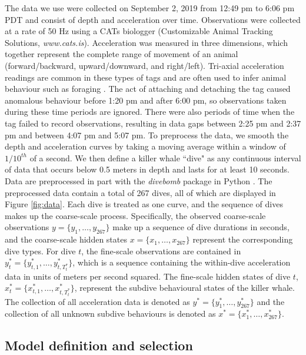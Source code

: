 The data we use were collected on September 2, 2019 from 12:49 pm to 6:06 pm PDT and consist of depth and acceleration over time. Observations were collected at a rate of 50 Hz using a CATs biologger (Customizable Animal Tracking Solutions, {\em{www.cats.is}}). Acceleration was measured in three dimensions, which together represent the complete range of movement of an animal (forward/backward, upward/downward, and right/left). Tri-axial acceleration readings are common in these types of tags and are often used to infer animal behaviour such as foraging \citep{Cade:2017,Fehlmann:2017,Wright:2017}. The act of attaching and detaching the tag caused anomalous behaviour before 1:20 pm and after 6:00 pm, so observations taken during these time periods are ignored. There were also periods of time when the tag failed to record observations, resulting in data gaps between 2:25 pm and 2:37 pm and between 4:07 pm and 5:07 pm. To preprocess the data, we smooth the depth and acceleration curves by taking a moving average within a window of $1/10^{th}$ of a second. We then define a killer whale ``dive" as any continuous interval of data that occurs below 0.5 meters in depth and lasts for at least 10 seconds. Data are preprocessed in part with the \textit{divebomb} package in Python \citep{Nunes:2018}. The preprocessed data contain a total of 267 dives, all of which are displayed in Figure \ref{fig:data}. Each dive is treated as one curve, and the sequence of dives makes up the coarse-scale process. Specifically, the observed coarse-scale observations $y = \big\{y_1,\ldots,y_{267}\big\}$ make up a sequence of dive durations in seconds, and the coarse-scale hidden states $x = \big\{x_1,\ldots,x_{267}\big\}$ represent the corresponding dive types. For dive $t$, the fine-scale observations are contained in $y^*_{t} = \big\{y^*_{t,1},\ldots,y^*_{t,T^*_t} \big\}$, which is a sequence containing the within-dive acceleration data in units of meters per second squared. The fine-scale hidden states of dive $t$, $x^*_{t} = \big\{x^*_{t,1},\ldots,x^*_{t,T^*_t} \big\}$, represent the subdive behavioural states of the killer whale. The collection of all acceleration data is denoted as $y^* = \big\{y^*_1,\ldots,y^*_{267}\big\}$ and the collection of all unknown subdive behaviours is denoted as $x^* = \big\{x^*_1,\ldots,x^*_{267}\big\}$.

\subsection{Model definition and selection}
\label{subsec:model_selection}

